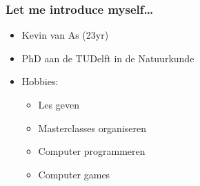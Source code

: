 

\begin{frame} %
\frametitle{Let me introduce myself\ldots}

\begin{itemize}
  \item Kevin van As (23yr)
  \pause
  \item PhD aan de TUDelft in de Natuurkunde
  \pause
  \item Hobbies:
  \begin{itemize}
  	\item Les geven
  	\item Masterclasses organiseren
  	\pause
  	\item Computer programmeren
  	\pause
  	\item Computer games
  \end{itemize}
\end{itemize}
\end{frame}

